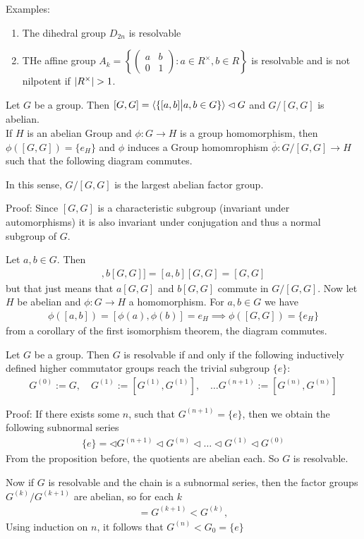 Examples:
\begin{enumerate}
	\item The dihedral group $D_{2n}$ is resolvable
	\item THe affine group $A_k = \left\{\begin{pmatrix}
	a & b\\
	0 & 1
\end{pmatrix}: a \in R^{\times},b \in R\right\}$ is resolvable and is not nilpotent if $\vert R^{\times}\vert > 1$.
\end{enumerate}


\begin{proposition}[]
	Let $G$ be a group. Then $[G,G] = \langle\{[a,b] \big\vert a,b \in G\}\rangle \lhd G$ and $G/[G,G]$ is abelian.\\
	If $H$ is an abelian Group and $\phi: G \to H$ is a group homomorphism, then $\phi([G,G]) = \{e_H\}$ and $\phi$ induces a Group homomrophism $\overline{\phi}: G/[G,G] \to H$ such that the following diagram commutes.
\begin{center}
\end{center}
In this sense, $G/[G,G]$ is the largest abelian factor group.
\end{proposition}

Proof: Since $[G,G]$ is a characteristic subgroup (invariant under automorphisms) it is also invariant under conjugation and thus a normal subgroup of $G$.

Let $a,b \in G$. Then
\begin{align*}
	[a[G,G],b[G,G]] = [a,b][G,G] = [G,G]
\end{align*}
but that just means that $a[G,G]$ and $b[G,G]$ commute in $G/[G,G]$.
Now let $H$ be abelian and $\phi: G \to H$ a homomorphism. For $a,b \in G$ we have
\begin{align*}
	\phi([a,b]) = [\phi(a), \phi(b)] = e_H \implies \phi([G,G]) = \{e_H\}
\end{align*}
from a corollary of the first isomorphism theorem, the diagram commutes.


\begin{proposition}[]
Let $G$ be a group. Then $G$ is resolvable if and only if the following inductively defined higher commutator groups reach the trivial subgroup $\{e\}$:
\begin{align*}
	G^{(0)} := G, \quad G^{(1)} := [G^{(1)}, G^{(1)}], \quad \ldots G^{(n+1)} := [G^{(n)}, G^{(n)}]
\end{align*}
\end{proposition}
Proof: If there exists some $n$, such that $G^{(n+1)} = \{e\}$, then we obtain the following subnormal series
\begin{align*}
	\{e\} = \lhd G^{(n+1)} \lhd G^{(n)} \lhd \ldots \lhd G^{(1)} \lhd G^{(0)}
\end{align*}
From the proposition before, the quotients are abelian each. So $G$ is resolvable.

Now if $G$ is resolvable and the chain is a subnormal series, then the factor groups $G^{(k)}/G^{(k+1)}$ are abelian, so for each $k$
\begin{align*}
	[G^{(k)},G^{(k)}] = G^{(k+1)} < G^{(k)},
\end{align*}
Using induction on $n$, it follows that $G^{(n)} < G_0 = \{e\}$

